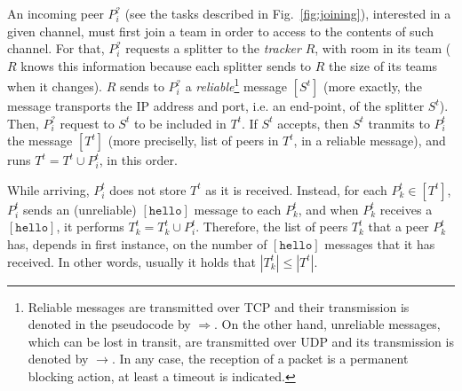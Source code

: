 
\label{sec:peer_joining}
\begin{figure*}
  \caption{Tasks involved in a peer joining. $P^t_i$ is an incoming
    peer, and $P^t_k$ is a peer that is already in the team. $R$
    represents the tracker, and $S^t$ the splitter of the team $T^t$
    to which $P^t_i$ will be added.\label{fig:joining}}
\end{figure*}
An incoming peer $P^?_i$ (see the tasks described in
Fig.~\ref{fig:joining}), interested in a given channel, must first
join a team in order to access to the contents of such channel. For
that, $P^?_i$ requests a splitter to the \emph{tracker} $R$, with room
in its team ($R$ knows this information because each splitter sends to
$R$ the size of its teams when it changes). $R$ sends to $P^?_i$ a
\emph{reliable}\footnote{Reliable messages are transmitted over TCP
  and their transmission is denoted in the pseudocode by
  $\Rightarrow$. On the other hand, unreliable messages, which can be
  lost in transit, are transmitted over UDP and its transmission is
  denoted by $\rightarrow$. In any case, the reception of a packet is
  a permanent blocking action, at least a timeout is indicated.}
message $[S^t]$ (more exactly, the message transports the IP address
and port, i.e. an end-point, of the splitter $S^t$). Then, $P^?_i$
request to $S^t$ to be included in $T^t$. If $S^t$ accepts, then $S^t$
tranmits to $P^t_i$ the message $[T^t]$ (more preciselly, list of
peers in $T^t$, in a reliable message), and runs $T^t = T^t \cup
P^t_i$, in this order.

While arriving, $P^t_i$ does not store $T^t$ as it is
received. Instead, for each $P^t_k\in [T^t]$, $P^t_i$ sends an
(unreliable) $[\mathtt{hello}]$ message to each $P^t_k$, and when
$P^t_k$ receives a $[\mathtt{hello}]$, it performs $T^t_k = T^t_k \cup
P^t_i$. Therefore, the list of peers $T^t_k$ that a peer $P^t_k$ has,
depends in first instance, on the number of $[\mathtt{hello}]$
messages that it has received. In other words, usually it holds that
$|T^t_k| \le |T^t|$.

